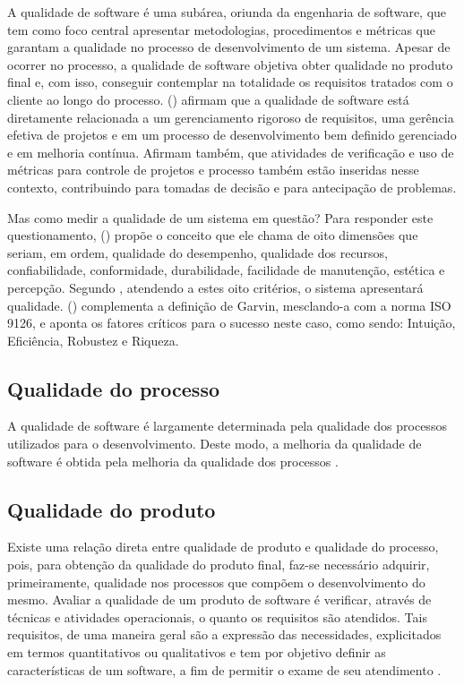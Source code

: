 \documentclass[tg]{mdtufsm}
\begin{document}
A qualidade de software é uma subárea, oriunda da engenharia de software, que tem como foco central apresentar metodologias,
procedimentos e métricas que garantam a qualidade no processo de desenvolvimento de um sistema. Apesar de ocorrer no processo, a qualidade de software
objetiva obter qualidade no produto final e, com isso, conseguir contemplar na totalidade os requisitos tratados com o cliente ao longo do processo.
\citeauthor{de2006introduccao} (\citeyear{de2006introduccao}) afirmam que a qualidade de software está diretamente relacionada a um gerenciamento
rigoroso de requisitos, uma gerência efetiva de projetos e em um processo de desenvolvimento bem definido gerenciado e em melhoria contínua. Afirmam também,
que atividades de verificação e uso de métricas para controle de projetos e processo também estão inseridas nesse contexto, contribuindo para tomadas de
decisão e para antecipação de problemas.

Mas como medir a qualidade de um sistema em questão? Para responder este questionamento, \citeauthor{garvin1987competing} (\citeyear{garvin1987competing}) propõe o conceito que ele chama de
oito dimensões que seriam, em ordem, qualidade do desempenho, qualidade dos recursos, confiabilidade, conformidade, durabilidade, facilidade de manutenção,
estética e percepção. Segundo \citeauthor{garvin1987competing}, atendendo a estes oito critérios, o sistema apresentará qualidade.
\citeauthor{pressman2011engenharia} (\citeyear{pressman2011engenharia}) complementa a definição de Garvin, mesclando-a com a norma ISO 9126, e aponta os fatores
críticos para o sucesso neste caso, como sendo: Intuição, Eficiência, Robustez e Riqueza.

\subsection{Qualidade do processo}
A qualidade de software é largamente determinada pela qualidade dos processos utilizados para o desenvolvimento. Deste modo, a melhoria
da qualidade de software é obtida pela melhoria da qualidade dos processos \cite{koscianski2007qualidade}.

\subsection{Qualidade do produto}
Existe uma relação direta entre qualidade de produto e qualidade do processo, pois, para obtenção da qualidade do produto final,
faz-se necessário adquirir, primeiramente, qualidade nos processos que compõem o desenvolvimento do mesmo.
Avaliar a qualidade de um produto de software é verificar, através de técnicas e atividades operacionais, o quanto os requisitos são atendidos. Tais requisitos,
de uma maneira geral são a expressão das necessidades, explicitados em termos quantitativos ou qualitativos e tem por objetivo definir as características de
um software, a fim de permitir o exame de seu atendimento \cite{koscianski2007qualidade}.
\end{document}
